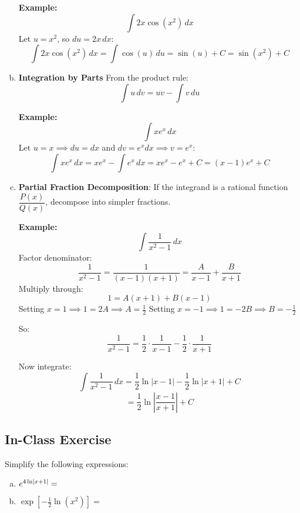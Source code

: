 \begin{fullwidth}
\begin{highlight}
\begin{enumerate}[a)]
    \textbf{Example:}  
    \[
    \int 2x \cos(x^2)\,dx
    \]
    Let $u = x^2$, so $du = 2x\,dx$:
    \[
    \int 2x \cos(x^2)\,dx = \int \cos(u)\,du = \sin(u) + C = \sin(x^2) + C
    \]

    \item \textbf{Integration by Parts}
    From the product rule:
    \[
    \int u \, dv = uv - \int v \, du
    \]
    
    \textbf{Example:}  
    \[
    \int x e^x\,dx
    \]
    Let $u = x \implies du = dx$ and $dv = e^x dx \implies v = e^x$:
    \[
    \int x e^x\,dx = x e^x - \int e^x\,dx = x e^x - e^x + C = (x-1)e^x + C
    \]

    \item \textbf{Partial Fraction Decomposition}: 
    If the integrand is a rational function \(\dfrac{P(x)}{Q(x)}\), decompose into simpler fractions.
    
    \textbf{Example:}  
    \[
    \int \frac{1}{x^2 - 1}\,dx
    \]
    Factor denominator:
    \[
    \frac{1}{x^2 - 1} = \frac{1}{(x-1)(x+1)} = \frac{A}{x-1} + \frac{B}{x+1}
    \]
    Multiply through:
    \[
    1 = A(x+1) + B(x-1)
    \]
    Setting $x=1 \implies 1 = 2A \implies A = \tfrac{1}{2}$  
    Setting $x=-1 \implies 1 = -2B \implies B = -\tfrac{1}{2}$
    
    So:
    \[
    \frac{1}{x^2 - 1} = \frac{1}{2}\cdot \frac{1}{x-1} - \frac{1}{2}\cdot \frac{1}{x+1}
    \]
    
    Now integrate:
    \[
    \int \frac{1}{x^2 - 1}\,dx = \frac{1}{2}\ln|x-1| - \frac{1}{2}\ln|x+1| + C
    \]
    \[
    = \frac{1}{2}\ln\left|\frac{x-1}{x+1}\right| + C
    \]
\end{enumerate}
\end{highlight}
\end{fullwidth}

\vspace{2cm}




\subsection*{In-Class Exercise}

\begin{question}
  Simplify the following expressions:
  \begin{enumerate}[(a)]
  \item \(e^{4 \ln\lvert x+1\rvert} = \)  \solspace{0.3in}
  \item \(\exp\left[ -\frac{1}{2}\ln(x^{2}) \right] = \)  \solspace{0.3in}
  \end{enumerate}
\end{question}
  \solspace{0.3in}



